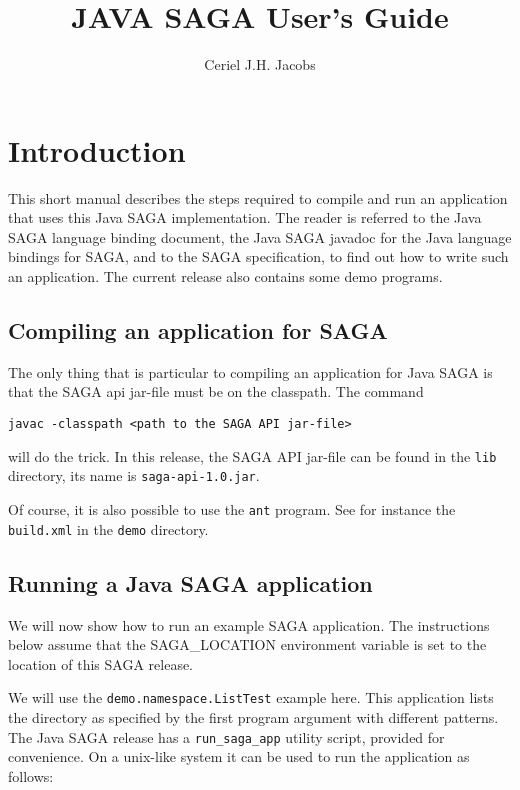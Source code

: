 \documentclass[a4paper,10pt]{article}
\begin{document}
\title{JAVA SAGA User's Guide}

\author{Ceriel J.H. Jacobs}

\maketitle

\section{Introduction}

This short manual describes the steps required to compile
and run an application that uses this Java SAGA implementation.
The reader is referred to the
Java SAGA language binding document, the Java SAGA javadoc for the
Java language bindings for SAGA, and to the SAGA specification,
to find out how to write such an application. The current release also
contains some demo programs.

\subsection{Compiling an application for SAGA}

The only thing that is particular to compiling an application for
Java SAGA is that the SAGA api jar-file must be on the classpath.
The command
\noindent
{\small
\begin{verbatim}
javac -classpath <path to the SAGA API jar-file>
\end{verbatim}
}
\noindent
will do the trick. In this release, the SAGA API jar-file can be found
in the \texttt{lib} directory, its name is \texttt{saga-api-1.0.jar}.

Of course, it is also possible to use the \texttt{ant} program.
See for instance the \texttt{build.xml} in the \texttt{demo} directory.

\subsection{Running a Java SAGA application}

We will now show how to run an example SAGA application.
The instructions below assume that the SAGA\_LOCATION
environment variable is set to the location of this SAGA release.

We will use the \texttt{demo.namespace.ListTest} example here.
This application lists the directory as specified by the first
program argument with different patterns. The Java SAGA release
has a \texttt{run\_saga\_app} utility script, provided for
convenience. 
On a unix-like system it can be used to run the application as follows:
\end{document}
